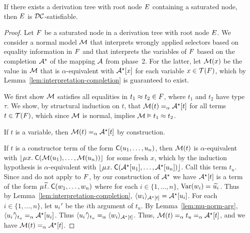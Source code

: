 \begin{theorem}%
\label{thm:ss}%
\afterDot
If there exists a derivation tree with root node $\Ec$ containing a saturated node, then $\Ec$ is $\thD$-satisfiable.
\end{theorem}
\begin{proof}
Let $\Fc$ be a saturated node in a derivation tree with root node $\Ec$.
We consider a normal model $\M$
that interprets wrongly applied selectors based on equality information in $\Fc$
and that interprets the variables of $\Fc$ based on the completion $\ValC$ of the mapping $\Val$ from phase~2.
For the latter, let $\M( x )$ be the value in $\M$ that is $\alpha$-equivalent with $\ValC \ec{x}$ for each variable $x \in \mathcal{T}(\Fc)$,
which by Lemma~\ref{lem:interpretation-completion} is guaranteed to exist.

We first show $\M$ satisfies all equalities in $t_1 \teq t_2 \in \Fc$, where $t_1$ and $t_2$ have type $\tau$.
We show,
by structural induction on $t$,
that $\M( t ) \aequiv \ValC \ec{t}$ for all terms $t \in \mathcal{T}( \Fc )$,
which since $\M$ is normal, implies $\M \models t_1 \teq t_2$.

If $t$ is a variable, then $\M( t ) \vsim \ValC \ec{ t }$ by construction.

If $t$ is a constructor term of the form $\const{C}( u_1, \ldots, u_n )$,
then $\M( t )$ is $\alpha$-equivalent with $\nf{\MU x.\; \const{C}( \M( u_1 ), \ldots, \M( u_n ) ) }$ for some fresh $x$,
which by the induction hypothesis is $\alpha$-equivalent with $\nf{\MU x.\; \const{C}( \ValC \ec{ u_1 }, \ldots, \ValC \ec{ u_n } )}$.
Call this term $t_u$.
Since  and  do not apply to $\Fc$,
by our construction of $\ValC$ we have $\ValC \ec{t}$ is a term
of the form $\MU {\Varec{t}}.\; \const{C}( w_1, \ldots, w_n )$
where for each $i \in \{1,\ldots, n\}$, %
$\muvar(w_i) = {\Varec{u_i}}$.  Thus by Lemma~\ref{lem:interpretation-completion},
$\interp{\ValC \ec{t}}{w_i} = \ValC \ec{u_i}$.
For each $i \in \{1,\ldots, n\}$, let $u_\iPrime$ be the $i$\vvthinspace th argument of $t_u$.
By Lemma~\ref{lem:mu-norm-arg}, $\interp{t_u}{u_\iPrime} \vsim \ValC \ec{u_i}$.
Thus $\interp{t_u}{u_\iPrime} \vsim \interp{\ValC \ec{t}}{ w_i }$. %
Thus, $\M( t ) \vsim t_u \vsim \ValC \ec{t}$, and
we have $\M( t ) \vsim \ValC \ec{t}$.


\end{proof}
